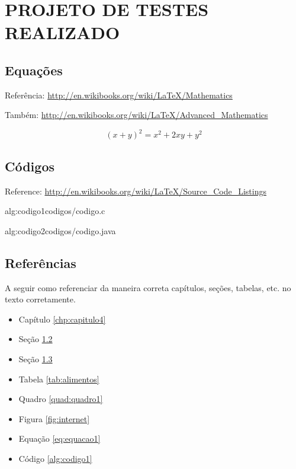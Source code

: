 \chapter{PROJETO DE TESTES REALIZADO}
\label{chp:capitulo5}

\section{Equações}
\label{sec:equacoes}
Referência: \url{http://en.wikibooks.org/wiki/LaTeX/Mathematics}

Também: \url{http://en.wikibooks.org/wiki/LaTeX/Advanced_Mathematics}

\begin{equation}
  (x + y)^2 = x^2 + 2xy + y^2
  \label{eq:equacao1}
\end{equation}

\section{Códigos}
\label{sec:codigos}
Reference: \url{http://en.wikibooks.org/wiki/LaTeX/Source_Code_Listings}

 {alg:codigo1}{codigos/codigo.c}

 {alg:codigo2}{codigos/codigo.java}

\section{Referências}
\label{sec:referencias}

A seguir como referenciar da maneira correta capítulos, seções, tabelas, etc. no texto corretamente.\\

\begin{itemize}
  \item Capítulo \ref{chp:capitulo4}
  \item Seção \ref{sec:codigos}
  \item Seção \ref{sec:referencias}
  \item Tabela \ref{tab:alimentos}
  \item Quadro \ref{quad:quadro1}
  \item Figura \ref{fig:internet}
  \item Equação \ref{eq:equacao1}
  \item Código \ref{alg:codigo1}
\end{itemize}

